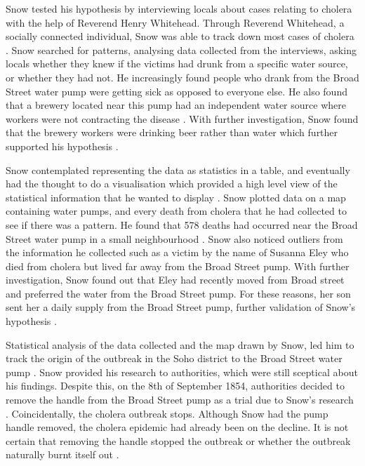 \documentclass[12pt]{article}
\begin{document}
Snow tested his hypothesis by interviewing locals about cases relating to cholera with the help of Reverend Henry Whitehead. Through Reverend Whitehead, a socially connected individual, Snow was able to track down most cases of cholera \cite{tedtalk}. Snow searched for patterns, analysing data collected from the interviews, asking locals whether they knew if the victims had drunk from a specific water source, or whether they had not. He increasingly found people who drank from the Broad Street water pump were getting sick as opposed to everyone else. He also found that a brewery located near this pump had an independent water source where workers were not contracting the disease \cite{blog}. With further investigation, Snow found that the brewery workers were drinking beer rather than water which further supported his hypothesis \cite{youtube}.

Snow contemplated representing the data as statistics in a table, and eventually had the thought to do a visualisation which provided a high level view of the statistical information that he wanted to display \cite{tedtalk}. Snow plotted data on a map containing water pumps, and every death from cholera that he had collected to see if there was a pattern. He found that 578 deaths had occurred near the Broad Street water pump in a small neighbourhood \cite{channel1}. Snow also noticed outliers from the information he collected such as a victim by the name of Susanna Eley who died from cholera but lived far away from the Broad Street pump. With further investigation, Snow found out that Eley had recently moved from Broad street and preferred the water from the Broad Street pump. For these reasons, her son sent her a daily supply from the Broad Street pump, further validation of Snow's hypothesis \cite{channel1}. 

Statistical analysis of the data collected and the map drawn by Snow, led him to track the origin of the outbreak in the Soho district to the Broad Street water pump \cite{test}.
Snow provided his research to authorities, which were still sceptical about his findings. Despite this, on the 8th of September 1854, authorities decided to remove the handle from the Broad Street pump as a trial due to Snow's research \cite{ucla, youtube}. Coincidentally, the cholera outbreak stops. Although Snow had the pump handle removed, the cholera epidemic had already been on the decline. It is not certain that removing the handle stopped the outbreak or whether the outbreak naturally burnt itself out \cite{original}.
\end{document}
